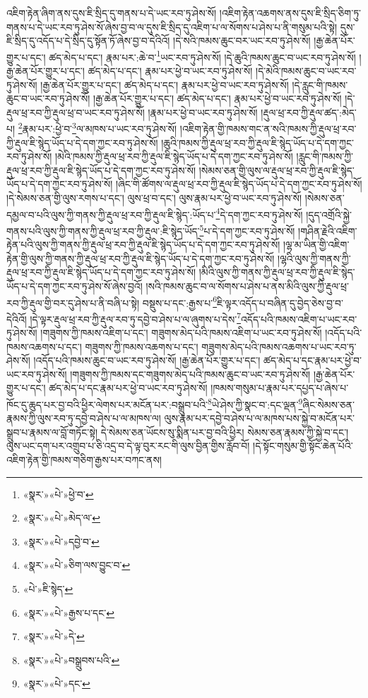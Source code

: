 འཇིག་རྟེན་ཞིག་ནས་དུས་ཇི་སྲིད་དུ་གནས་པ་དེ་ཡང་རབ་ཏུ་ཤེས་སོ། །འཇིག་རྟེན་འཆགས་ནས་དུས་ཇི་སྲིད་ཅིག་ཏུ་གནས་པ་དེ་ཡང་རབ་ཏུ་ཤེས་སོ་ཞེས་བྱ་བ་ལ་དུས་ཇི་སྲིད་དུ་འཇིག་པ་ལ་སོགས་པ་ཤེས་པ་ནི་གསུམ་པའི་སྟེ། དུས་ཇི་སྲིད་དུ་འདོད་པ་དེ་སྲིད་དུ་སྟོན་ཏོ་ཞེས་བྱ་བ་དེའིའོ། །དེ་སའི་ཁམས་ཆུང་བར་ཡང་རབ་ཏུ་ཤེས་སོ། །རྒྱ་ཆེན་པོར་གྱུར་པ་དང་། ཚད་མེད་པ་དང་། རྣམ་པར་:ཆེ་བ་\footnote{«སྣར་»«པེ་»ཕྱེ་བ་}ཡང་རབ་ཏུ་ཤེས་སོ། །དེ་ཆུའི་ཁམས་ཆུང་བ་ཡང་རབ་ཏུ་ཤེས་སོ། །རྒྱ་ཆེན་པོར་གྱུར་པ་དང་། ཚད་མེད་པ་དང་། རྣམ་པར་ཕྱེ་བ་ཡང་རབ་ཏུ་ཤེས་སོ། །དེ་མེའི་ཁམས་ཆུང་བ་ཡང་རབ་ཏུ་ཤེས་སོ། །རྒྱ་ཆེན་པོར་གྱུར་པ་དང་། ཚད་མེད་པ་དང་། རྣམ་པར་ཕྱེ་བ་ཡང་རབ་ཏུ་ཤེས་སོ། །དེ་རླུང་གི་ཁམས་ཆུང་བ་ཡང་རབ་ཏུ་ཤེས་སོ། །རྒྱ་ཆེན་པོར་གྱུར་པ་དང་། ཚད་མེད་པ་དང་། རྣམ་པར་ཕྱེ་བ་ཡང་རབ་ཏུ་ཤེས་སོ། །དེ་རྡུལ་ཕྲ་རབ་ཀྱི་རྡུལ་ཕྲ་བ་ཡང་རབ་ཏུ་ཤེས་སོ། །རྣམ་པར་ཕྱེ་བ་ཡང་རབ་ཏུ་ཤེས་སོ། །རྡུལ་ཕྲ་རབ་ཀྱི་རྡུལ་ཚད་:མེད་པ། \footnote{«སྣར་»«པེ་»མེད་ལ་}རྣམ་པར་:ཕྱེ་བ་\footnote{«སྣར་»«པེ་»དབྱེ་བ་}ལ་མཁས་པ་ཡང་རབ་ཏུ་ཤེས་སོ། །འཇིག་རྟེན་གྱི་ཁམས་གང་ན་སའི་ཁམས་ཀྱི་རྡུལ་ཕྲ་རབ་ཀྱི་རྡུལ་ཇི་སྙེད་ཡོད་པ་དེ་དག་ཀྱང་རབ་ཏུ་ཤེས་སོ། །ཆུའི་ཁམས་ཀྱི་རྡུལ་ཕྲ་རབ་ཀྱི་རྡུལ་ཇི་སྙེད་ཡོད་པ་དེ་དག་ཀྱང་རབ་ཏུ་ཤེས་སོ། །མེའི་ཁམས་ཀྱི་རྡུལ་ཕྲ་རབ་ཀྱི་རྡུལ་ཇི་སྙེད་ཡོད་པ་དེ་དག་ཀྱང་རབ་ཏུ་ཤེས་སོ། །རླུང་གི་ཁམས་ཀྱི་རྡུལ་ཕྲ་རབ་ཀྱི་རྡུལ་ཇི་སྙེད་ཡོད་པ་དེ་དག་ཀྱང་རབ་ཏུ་ཤེས་སོ། །སེམས་ཅན་གྱི་ལུས་ལ་རྡུལ་ཕྲ་རབ་ཀྱི་རྡུལ་ཇི་སྙེད་ཡོད་པ་དེ་དག་ཀྱང་རབ་ཏུ་ཤེས་སོ། །ཞིང་གི་ཚོགས་ལ་རྡུལ་ཕྲ་རབ་ཀྱི་རྡུལ་ཇི་སྙེད་ཡོད་པ་དེ་དག་ཀྱང་རབ་ཏུ་ཤེས་སོ། །དེ་སེམས་ཅན་གྱི་ལུས་རགས་པ་དང་། ལུས་ཕྲ་བ་དང་། ལུས་རྣམ་པར་ཕྱེ་བ་ཡང་རབ་ཏུ་ཤེས་སོ། །སེམས་ཅན་དམྱལ་བ་པའི་ལུས་ཀྱི་གནས་ཀྱི་རྡུལ་ཕྲ་རབ་ཀྱི་རྡུལ་ཇི་སྙེད་:ཡོད་པ་\footnote{«སྣར་»«པེ་»ཅིག་ལས་བྱུང་བ་}དེ་དག་ཀྱང་རབ་ཏུ་ཤེས་སོ། །དུད་འགྲོའི་སྐྱེ་གནས་པའི་ལུས་ཀྱི་གནས་ཀྱི་རྡུལ་ཕྲ་རབ་ཀྱི་རྡུལ་:ཇི་སྙེད་ཡོད་\footnote{«པེ་»ཇི་སྙེད་}པ་དེ་དག་ཀྱང་རབ་ཏུ་ཤེས་སོ། །གཤིན་རྗེའི་འཇིག་རྟེན་པའི་ལུས་ཀྱི་གནས་ཀྱི་རྡུལ་ཕྲ་རབ་ཀྱི་རྡུལ་ཇི་སྙེད་ཡོད་པ་དེ་དག་ཀྱང་རབ་ཏུ་ཤེས་སོ། །ལྷ་མ་ཡིན་གྱི་འཇིག་རྟེན་གྱི་ལུས་ཀྱི་གནས་ཀྱི་རྡུལ་ཕྲ་རབ་ཀྱི་རྡུལ་ཇི་སྙེད་ཡོད་པ་དེ་དག་ཀྱང་རབ་ཏུ་ཤེས་སོ། །ལྷའི་ལུས་ཀྱི་གནས་ཀྱི་རྡུལ་ཕྲ་རབ་ཀྱི་རྡུལ་ཇི་སྙེད་ཡོད་པ་དེ་དག་ཀྱང་རབ་ཏུ་ཤེས་སོ། །མིའི་ལུས་ཀྱི་གནས་ཀྱི་རྡུལ་ཕྲ་རབ་ཀྱི་རྡུལ་ཇི་སྙེད་ཡོད་པ་དེ་དག་ཀྱང་རབ་ཏུ་ཤེས་སོ་ཞེས་བྱའོ། །སའི་ཁམས་ཆུང་བ་ལ་སོགས་པ་ཤེས་པ་ནས་མིའི་ལུས་ཀྱི་རྡུལ་ཕྲ་རབ་ཀྱི་རྡུལ་གྱི་བར་དུ་ཤེས་པ་ནི་བཞི་པ་སྟེ། བསྡུས་པ་དང་:རྒྱས་པ་\footnote{«སྣར་»«པེ་»རྒྱས་པ་དང་}ཇི་ལྟར་འདོད་པ་བཞིན་དུ་བྱེད་ཅེས་བྱ་བ་དེའིའོ། །དེ་ལྟར་རྡུལ་ཕྲ་རབ་ཀྱི་རྡུལ་རབ་ཏུ་དབྱེ་བ་ཤེས་པ་ལ་ཞུགས་པ་དེས་\footnote{«སྣར་»«པེ་»དེ་}འདོད་པའི་ཁམས་འཇིག་པ་ཡང་རབ་ཏུ་ཤེས་སོ། །གཟུགས་ཀྱི་ཁམས་འཇིག་པ་དང་། གཟུགས་མེད་པའི་ཁམས་འཇིག་པ་ཡང་རབ་ཏུ་ཤེས་སོ། །འདོད་པའི་ཁམས་འཆགས་པ་དང་། གཟུགས་ཀྱི་ཁམས་འཆགས་པ་དང་། གཟུགས་མེད་པའི་ཁམས་འཆགས་པ་ཡང་རབ་ཏུ་ཤེས་སོ། །འདོད་པའི་ཁམས་ཆུང་བ་ཡང་རབ་ཏུ་ཤེས་སོ། །རྒྱ་ཆེན་པོར་གྱུར་པ་དང་། ཚད་མེད་པ་དང་རྣམ་པར་ཕྱེ་བ་ཡང་རབ་ཏུ་ཤེས་སོ། །གཟུགས་ཀྱི་ཁམས་དང་གཟུགས་མེད་པའི་ཁམས་ཆུང་བ་ཡང་རབ་ཏུ་ཤེས་སོ། །རྒྱ་ཆེན་པོར་གྱུར་པ་དང་། ཚད་མེད་པ་དང་རྣམ་པར་ཕྱེ་བ་ཡང་རབ་ཏུ་ཤེས་སོ། །ཁམས་གསུམ་པ་རྣམ་པར་དཔྱད་པ་ཞེས་པ་ཁོང་དུ་ཆུད་པར་བྱ་བའི་ཕྱིར་ལེགས་པར་མངོན་པར་:བསྒྲུབ་པའི་\footnote{«སྣར་»«པེ་»བསྒྲུབས་པའི་}ཡེ་ཤེས་ཀྱི་སྣང་བ་:དང་ལྡན་\footnote{«སྣར་»«པེ་»དང་}ཞིང་སེམས་ཅན་རྣམས་ཀྱི་ལུས་རབ་ཏུ་དབྱེ་བ་ཤེས་པ་ལ་མཁས་ལ། ལུས་རྣམ་པར་དབྱེ་བ་ཤེས་པ་ལ་མཁས་པས་སྐྱེ་བ་མངོན་པར་སྒྲུབ་པ་རྣམས་ལ་བློ་གཏོང་སྟེ། དེ་སེམས་ཅན་ཡོངས་སུ་སྨིན་པར་བྱ་བའི་ཕྱིར། སེམས་ཅན་རྣམས་ཀྱི་སྐྱེ་བ་དང་། ལུས་ཡང་དག་པར་འགྲུབ་པ་ཅི་འདྲ་བ་དེ་ལྟ་བུར་རང་གི་ལུས་བྱིན་གྱིས་རློབ་བོ། །དེ་སྟོང་གསུམ་གྱི་སྟོང་ཆེན་པོའི་འཇིག་རྟེན་གྱི་ཁམས་གཅིག་རྒྱས་པར་བཀང་ནས། 